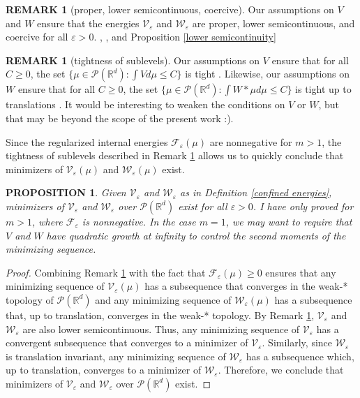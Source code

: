 \documentclass[11pt,leqno]{amsart}
\newtheorem{prop}[thm]{PROPOSITION}
\theoremstyle{definition}
\newtheorem{remark}[thm]{REMARK}
\newcommand{\kcomment}[1]{{\color{Aquamarine}#1}} %
\newcommand{\Rd}{{\mathord{\mathbb R}^d}}
\newcommand{\F}{\mathcal{F}}
\def\P{{\mathcal P}}
\def\e{\varepsilon}
\def\F{\mathcal{F}}
\begin{document}
\begin{remark}[proper, lower semicontinuous, coercive] \label{lsc remark}
\kcomment{Our assumptions on $V$ and $W$ ensure that the energies $\mathcal{V}_\e$ and $\mathcal{W}_\e$ are proper, lower semicontinuous, and coercive for all $\e >0$. \cite[Lemma 5.1.7]{AGS}, \cite[Lemma 2.2]{SimioneSlepcevTopaloglu}, and Proposition \ref{lower semicontinuity}}
\end{remark}

\begin{remark}[tightness of sublevels] \label{sublevel remark}
Our assumptions on $V$ ensure that for all $C \geq 0 $, the set $\{ \mu \in \P(\Rd) : \int V d \mu \leq C \}$ is tight \cite[Remark 5.1.5]{AGS}. Likewise, our assumptions on $W$ ensure that for all $C \geq 0$, the set $\{ \mu \in \P(\Rd) : \int W*\mu d \mu \leq C \}$ is tight up to translations \cite[Theorem 3.1]{SimioneSlepcevTopaloglu}.
\kcomment{It would be interesting to weaken the conditions on $V$ or $W$, but that may be beyond the scope of the present work :).}
\end{remark}

Since the regularized internal energies $\F_\e(\mu)$ are nonnegative for $m > 1$, the tightness of sublevels described in Remark \ref{sublevel remark} allows us to quickly conclude that minimizers of $ \mathcal{V}_\e(\mu) $ and $\mathcal{W}_\e(\mu)$ exist.

\begin{prop} \label{minimizersexist}
Given $\mathcal{V}_\e$ and $\mathcal{W}_\e$ as in Definition \ref{confined energies},  minimizers of $\mathcal{V}_\e$  and $\mathcal{W}_\e$ over $\P(\Rd)$ exist for all  $\e >0$. {\color{Aquamarine}  {I have only proved for $m >1$, where $\F_\e$ is nonnegative. In the case $m=1$, we may want to require that $V$ and $W$ have quadratic growth at infinity to control the second moments of the minimizing sequence.}}
\end{prop}


\begin{proof}
Combining Remark \ref{sublevel remark} with the fact that $\F_\e(\mu) \geq 0$ ensures that any minimizing sequence of $\mathcal{V}_\e(\mu)$ has a subsequence that converges in the weak-* topology of $\P(\Rd)$ and any minimizing sequence of $\mathcal{W}_\e(\mu)$ has a subsequence that, up to translation, converges in the weak-* topology. By Remark \ref{lsc remark}, $\mathcal{V}_\e$ and $\mathcal{W}_\e$ are also lower semicontinuous. Thus, any minimizing sequence of $\mathcal{V}_\e$ has a convergent subsequence that converges to a minimizer of $\mathcal{V}_\e$. Similarly, since $\mathcal{W}_\e$ is translation invariant, any minimizing sequence of $\mathcal{W}_\e$ has a subsequence which, up to translation, converges to a minimizer of $\mathcal{W}_\e$. Therefore, we conclude that minimizers of $\mathcal{V}_\e$ and $\mathcal{W}_\e$ over $\P(\Rd)$ exist.
\end{proof}
\end{document}
